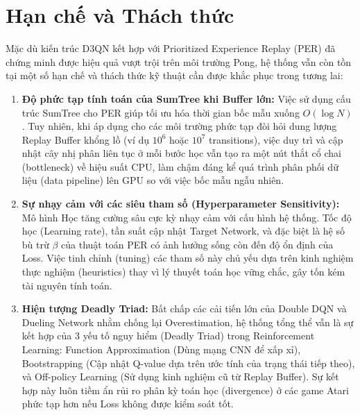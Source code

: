 \section{Hạn chế và Thách thức}

Mặc dù kiến trúc D3QN kết hợp với Prioritized Experience Replay (PER) đã chứng minh được hiệu quả vượt trội trên môi trường Pong, hệ thống vẫn còn tồn tại một số hạn chế và thách thức kỹ thuật cần được khắc phục trong tương lai:

\begin{enumerate}
    \item \textbf{Độ phức tạp tính toán của SumTree khi Buffer lớn:} Việc sử dụng cấu trúc SumTree cho PER giúp tối ưu hóa thời gian bốc mẫu xuống $O(\log N)$. Tuy nhiên, khi áp dụng cho các môi trường phức tạp đòi hỏi dung lượng Replay Buffer khổng lồ (ví dụ $10^6$ hoặc $10^7$ transitions), việc duy trì và cập nhật cây nhị phân liên tục ở mỗi bước học vẫn tạo ra một nút thắt cổ chai (bottleneck) về hiệu suất CPU, làm chậm đáng kể quá trình phân phối dữ liệu (data pipeline) lên GPU so với việc bốc mẫu ngẫu nhiên.
    
    \item \textbf{Sự nhạy cảm với các siêu tham số (Hyperparameter Sensitivity):} Mô hình Học tăng cường sâu cực kỳ nhạy cảm với cấu hình hệ thống. Tốc độ học (Learning rate), tần suất cập nhật Target Network, và đặc biệt là hệ số bù trừ $\beta$ của thuật toán PER có ảnh hưởng sống còn đến độ ổn định của Loss. Việc tinh chỉnh (tuning) các tham số này chủ yếu dựa trên kinh nghiệm thực nghiệm (heuristics) thay vì lý thuyết toán học vững chắc, gây tốn kém tài nguyên tính toán.
    
    \item \textbf{Hiện tượng Deadly Triad:} Bất chấp các cải tiến lớn của Double DQN và Dueling Network nhằm chống lại Overestimation, hệ thống tổng thể vẫn là sự kết hợp của 3 yếu tố nguy hiểm (Deadly Triad) trong Reinforcement Learning: Function Approximation (Dùng mạng CNN để xấp xỉ), Bootstrapping (Cập nhật Q-value dựa trên ước tính của trạng thái tiếp theo), và Off-policy Learning (Sử dụng kinh nghiệm cũ từ Replay Buffer). Sự kết hợp này luôn tiềm ẩn rủi ro phân kỳ toán học (divergence) ở các game Atari phức tạp hơn nếu Loss không được kiểm soát tốt.
\end{enumerate}
